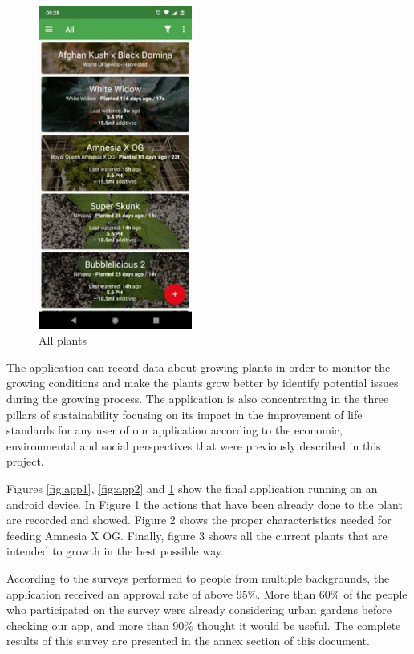 \begin{figure}[th]
\centering
\includegraphics[width=0.45\textwidth]{./Figures/app3.png}
\decoRule
\caption[All plants]{All plants}
\label{fig:app3}
\end{figure}

The application can record data about growing plants in order to monitor the growing conditions and make the plants grow better by identify potential issues during the growing process. The application is also concentrating in the three pillars of sustainability focusing on its impact in the improvement of life standards for any user of our application according to the economic, environmental and social perspectives that were previously described in this project.

Figures \ref{fig:app1}, \ref{fig:app2} and \ref{fig:app3} show the final application running on an android device. In Figure 1 the actions that have been already done to the plant are recorded and showed. Figure 2 shows the proper characteristics needed for feeding Amnesia X OG. Finally, figure 3 shows all the current plants that are intended to growth in the best possible way.

According to the surveys performed to people from multiple backgrounds, the application received an approval rate of above 95\%. More than 60\% of the people who participated on the survey were already considering urban gardens before checking our app, and more than 90\% thought it would be useful. The complete results of this survey are presented in the annex section of this document.

